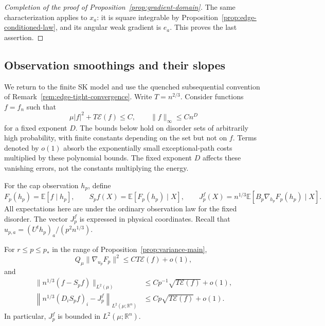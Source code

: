 \begin{proof}[Completion of the proof of Proposition~\ref{prop:gradient-domain}]
The same characterization applies to $x_a$: it is square integrable
by Proposition~\ref{prop:edge-conditioned-law}, and its angular weak
gradient is $e_a$. This proves the last assertion.
\end{proof}

\subsection{Observation smoothings and their slopes}

We return to the finite SK model and use the quenched subsequential
convention of Remark~\ref{rem:edge-tight-convergence}. Write
$T=n^{2/3}$. Consider functions $f=f_n$ such that
\[
 \mu|f|^2+T\mathcal E(f)\le C,
 \qquad \|f\|_\infty\le Cn^D
\]
for a fixed exponent $D$. The bounds below hold on disorder sets of
arbitrarily high probability, with finite constants depending on the
set but not on $f$. Terms denoted by $o(1)$ absorb the exponentially
small exceptional-path costs multiplied by these polynomial bounds.
The fixed exponent $D$ affects these vanishing errors, not the
constants multiplying the energy.

For the cap observation $h_p$, define
\[
 F_p(h_p)=\mathbb E[f\mid h_p],
 \qquad S_pf(X)=\mathbb E[F_p(h_p)\mid X],
 \qquad
 J_p^f(X)=n^{1/3}\mathbb E[B_p\nabla_{h_p}F_p(h_p)\mid X].
\]
All expectations here are under the ordinary observation law for the
fixed disorder. The vector $J_p^f$ is expressed in physical coordinates.
Recall that $u_{p,a}=(U^t h_p)_a/(p^2n^{1/3})$.

\begin{lemma}
\label{lem:gradient-smoothing}
For $r\le p\le p_*$ in the range of
Proposition~\ref{prop:variance-main},
\begin{equation}
 Q_\mu\|\nabla_{u_p}F_p\|^2
       \le C T\mathcal E(f)+o(1),
 \label{eq:source-26}
\end{equation}
and
\begin{equation}
 \begin{split}
 \|n^{1/3}(f-S_pf)\|_{L^2(\mu)}
       &\le Cp^{-1}\sqrt{T\mathcal E(f)}+o(1),\\
 \left\|n^{1/3}(D_iS_pf)_i-J_p^f\right\|_{L^2(\mu;\mathbb R^n)}
       &\le Cp\sqrt{T\mathcal E(f)}+o(1).
 \end{split}
 \label{eq:source-27}
\end{equation}
In particular, $J_p^f$ is bounded in $L^2(\mu;\mathbb R^n)$.
\end{lemma}

